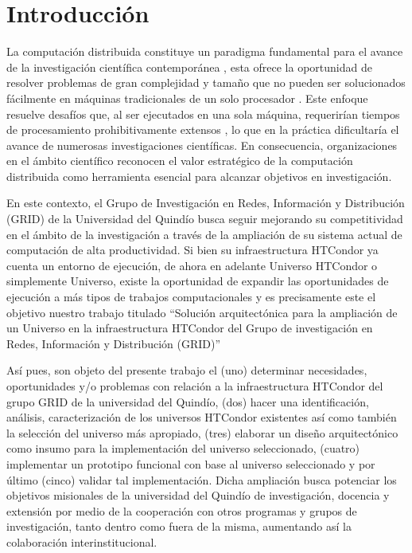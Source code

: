 \chapter{Introducción}

La computación distribuida constituye un paradigma fundamental para el avance de la investigación científica contemporánea \parencite{yang2011article}, esta ofrece la oportunidad de resolver problemas de gran complejidad y tamaño que no pueden ser solucionados fácilmente en máquinas tradicionales de un solo procesador \parencite{adeli2000article}. Este enfoque resuelve desafíos que, al ser ejecutados en una sola máquina, requerirían tiempos de procesamiento prohibitivamente extensos \parencite{yang2011article}, lo que en la práctica dificultaría el avance de numerosas investigaciones científicas. En consecuencia, organizaciones en el ámbito científico reconocen el valor estratégico de la computación distribuida como herramienta esencial para alcanzar objetivos en investigación. 

En este contexto, el Grupo de Investigación en Redes, Información y Distribución (GRID) de la Universidad del Quindío busca seguir mejorando su competitividad en el ámbito de la investigación a través de la ampliación de su sistema actual de computación de alta productividad. Si bien su infraestructura HTCondor ya cuenta un entorno de ejecución, de ahora en adelante Universo HTCondor o simplemente Universo, existe la oportunidad de expandir las oportunidades de ejecución a más tipos de trabajos computacionales y es precisamente este el objetivo nuestro trabajo titulado “Solución arquitectónica para la ampliación de un Universo en la infraestructura HTCondor del Grupo de investigación en Redes, Información y Distribución (GRID)”

Así pues, son objeto del presente trabajo el (uno) determinar necesidades, oportunidades y/o problemas con relación a la infraestructura HTCondor del grupo GRID de la universidad del Quindío, (dos) hacer una identificación, análisis, caracterización de los universos HTCondor existentes así como también la selección del universo más apropiado, (tres) elaborar un diseño arquitectónico como insumo para la implementación del universo seleccionado, (cuatro) implementar un prototipo funcional con base al universo seleccionado y por último (cinco) validar tal implementación. Dicha ampliación busca potenciar los objetivos misionales de la universidad del Quindío de investigación, docencia y extensión por medio de la cooperación con otros programas y grupos de investigación, tanto dentro como fuera de la misma, aumentando así la colaboración interinstitucional.

